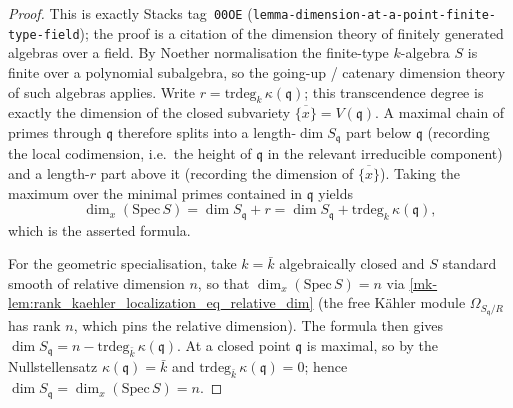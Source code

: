 \begin{proof}
  This is exactly Stacks tag~\texttt{00OE}
  (\texttt{lemma-dimension-at-a-point-finite-type-field}); the proof is a
  citation of the dimension theory of finitely generated algebras over a
  field. By Noether normalisation the finite-type \(k\)-algebra \(S\) is
  finite over a polynomial subalgebra, so the going-up / catenary
  dimension theory of such algebras applies. Write
  \(r = \mathrm{trdeg}_k\,\kappa(\mathfrak q)\); this transcendence
  degree is exactly the dimension of the closed subvariety
  \(\overline{\{x\}} = V(\mathfrak q)\). A maximal chain of primes
  through \(\mathfrak q\) therefore splits into a
  length-\(\dim S_{\mathfrak q}\) part below \(\mathfrak q\) (recording
  the local codimension, i.e.\ the height of \(\mathfrak q\) in the
  relevant irreducible component) and a length-\(r\) part above it
  (recording the dimension of \(\overline{\{x\}}\)). Taking the maximum
  over the minimal primes contained in \(\mathfrak q\) yields
  \[
    \dim_x(\mathrm{Spec}\,S) = \dim S_{\mathfrak q} + r
    = \dim S_{\mathfrak q} + \mathrm{trdeg}_k\,\kappa(\mathfrak q),
  \]
  which is the asserted formula.

  For the geometric specialisation, take
  \(k = \bar k\) algebraically closed and \(S\) standard smooth of
  relative dimension \(n\), so that \(\dim_x(\mathrm{Spec}\,S) = n\) via
  \ref{mk-lem:rank_kaehler_localization_eq_relative_dim} (the free
  K\"ahler module \(\Omega_{S_{\mathfrak q}/R}\) has rank \(n\), which
  pins the relative dimension). The formula then gives
  \(\dim S_{\mathfrak q} = n - \mathrm{trdeg}_{\bar k}\,\kappa(\mathfrak
  q)\). At a closed point \(\mathfrak q\) is maximal, so by the
  Nullstellensatz \(\kappa(\mathfrak q) = \bar k\) and
  \(\mathrm{trdeg}_{\bar k}\,\kappa(\mathfrak q) = 0\); hence
  \(\dim S_{\mathfrak q} = \dim_x(\mathrm{Spec}\,S) = n\).
\end{proof}

